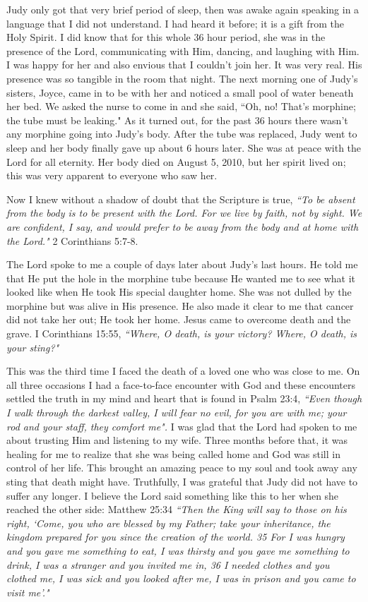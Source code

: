 \documentclass[oneside]{book}
\begin{document}
Judy only got that very  brief period of sleep, then was awake again speaking in a language that I did not understand. I had heard it before; it is a gift from the Holy Spirit. I did know that for this whole 36 hour period, she was in the presence of the Lord, communicating with Him, dancing, and laughing with Him. I was happy for her and also envious that I couldn't join her. It was very real. His presence was so tangible in the room that night. The next morning one of Judy's sisters, Joyce, came in to be with her and noticed a small pool of water beneath her bed. We asked the nurse to come in and she said, ``Oh, no! That's morphine; the tube must be leaking." As it turned out, for the past 36 hours there wasn't any morphine going into Judy's body. After the tube was replaced, Judy went to sleep and her body finally gave up about 6 hours later. She was at peace with the Lord for all eternity. Her body died on August 5, 2010, but her spirit lived on; this was very apparent to everyone who saw her.

Now I knew without a shadow of doubt that the Scripture is true, \textit{``To be absent from the body is to be present with the Lord. For we live by faith, not by sight. We are confident, I say, and would prefer to be away from the body and at home with the Lord."} 2 Corinthians 5:7-8.

The Lord spoke to me a couple of days later about Judy's last hours. He told me that He put the hole in the morphine tube because He wanted me to see what it looked like when He took His special daughter home. She was not dulled by the morphine but was alive in His presence. He also made it clear to me that cancer did not take her out; He took her home. Jesus came to overcome death and the grave. I Corinthians 15:55, \textit{``Where, O death, is your victory? Where, O death, is your sting?"}

This was the third time I faced the death of a loved one who was close to me. On all three occasions I had a face-to-face encounter with God and these encounters settled the truth in my mind and heart that is found in Psalm 23:4, \textit{``Even though I walk through the darkest valley, I will fear no evil, for you are with me; your rod and your staff, they comfort me".} I was glad that the Lord had spoken to me about trusting Him and listening to my wife. Three months before that, it was healing for me to realize that she was being called home and God was still in control of her life. This brought an amazing peace to my soul and took away any sting that death might have. Truthfully, I was grateful that Judy did not have to suffer any longer. I believe the Lord said something like this to her when she reached the other side:  Matthew 25:34 \textit{``Then the King will say to those on his right, `Come, you who are blessed by my Father; take your inheritance, the kingdom prepared for you since the creation of the world. 35 For I was hungry and you gave me something to eat, I was thirsty and you gave me something to drink, I was a stranger and you invited me in, 36 I needed clothes and you clothed me, I was sick and you looked after me, I was in prison and you came to visit me'."} 
\end{document}
